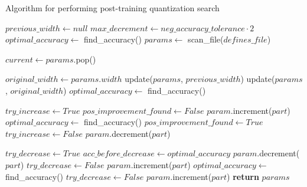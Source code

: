\begin{algorithm}
  \caption{Algorithm for performing post-training quantization search}\label{alg:post-training-quant}
  \begin{algorithmic}

  \State $previous\_width \gets null$
  \State $max\_decrement \gets neg\_accuracy\_tolerance \cdot 2$ 
  \State $optimal\_accuracy \gets$ find\_accuracy()
  \State $params \gets$ scan\_file($defines\_file$) 

    \State $current \gets params$.pop()

     
      \State $original\_width \gets params.width$
      \State update($params$, $previous\_width$)
        \State update($params$, $original\_width$)
      \Else
        \State $optimal\_accuracy \gets$ find\_accuracy()
      \EndIf
    \EndIf


      \State $try\_increase \gets True$
      \State $pos\_improvement\_found \gets False$
       
        \State $param$.increment($part$)
          \State $optimal\_accuracy \gets$ find\_accuracy()
          \State $pos\_improvement\_found \gets True$
        \Else
          \State $try\_increase \gets False$
          \State $param$.decrement($part$)
        \EndIf
      \EndWhile

       
        \State $try\_decrease \gets True$
        \State $acc\_before\_decrease \gets optimal\_accuracy$
          \State $param$.decrement($part$)
            \State $try\_decrease \gets False$
            \State $param$.increment($part$)
            \State $optimal\_accuracy \gets$ find\_accuracy()
          \Else
            \State $try\_decrease \gets False$
            \State $param$.increment($part$)
        \EndIf
        \EndWhile
      \EndIf
    \EndFor
  \EndWhile
  \State \textbf{return} $params$
  \EndFunction
  \end{algorithmic}
\end{algorithm}


